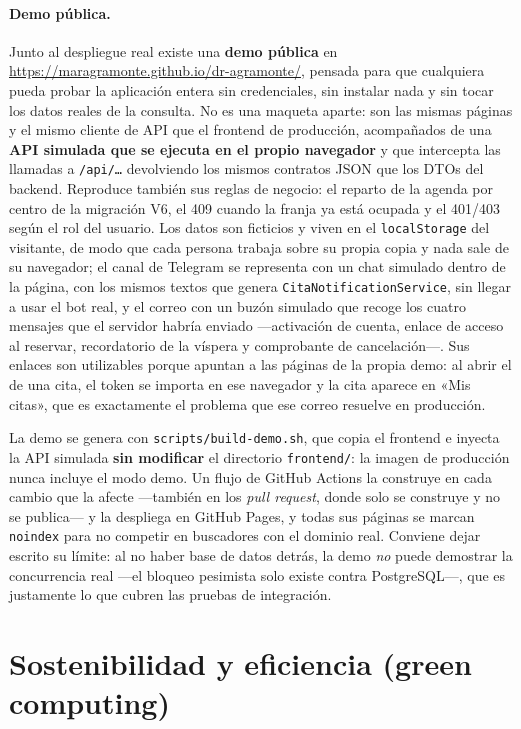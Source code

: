 \documentclass[12pt,a4paper]{report}
\begin{document}
\paragraph{Demo pública.} Junto al despliegue real existe una \textbf{demo pública} en \url{https://maragramonte.github.io/dr-agramonte/}, pensada para que cualquiera pueda probar la aplicación entera sin credenciales, sin instalar nada y sin tocar los datos reales de la consulta. No es una maqueta aparte: son las mismas páginas y el mismo cliente de API que el frontend de producción, acompañados de una \textbf{API simulada que se ejecuta en el propio navegador} y que intercepta las llamadas a \texttt{/api/\ldots} devolviendo los mismos contratos JSON que los DTOs del backend. Reproduce también sus reglas de negocio: el reparto de la agenda por centro de la migración V6, el 409 cuando la franja ya está ocupada y el 401/403 según el rol del usuario. Los datos son ficticios y viven en el \texttt{localStorage} del visitante, de modo que cada persona trabaja sobre su propia copia y nada sale de su navegador; el canal de Telegram se representa con un chat simulado dentro de la página, con los mismos textos que genera \texttt{CitaNotificationService}, sin llegar a usar el bot real, y el correo con un buzón simulado que recoge los cuatro mensajes que el servidor habría enviado —activación de cuenta, enlace de acceso al reservar, recordatorio de la víspera y comprobante de cancelación—. Sus enlaces son utilizables porque apuntan a las páginas de la propia demo: al abrir el de una cita, el token se importa en ese navegador y la cita aparece en «Mis citas», que es exactamente el problema que ese correo resuelve en producción.

La demo se genera con \texttt{scripts/build-demo.sh}, que copia el frontend e inyecta la API simulada \textbf{sin modificar} el directorio \texttt{frontend/}: la imagen de producción nunca incluye el modo demo. Un flujo de GitHub Actions la construye en cada cambio que la afecte —también en los \emph{pull request}, donde solo se construye y no se publica— y la despliega en GitHub Pages, y todas sus páginas se marcan \texttt{noindex} para no competir en buscadores con el dominio real. Conviene dejar escrito su límite: al no haber base de datos detrás, la demo \emph{no} puede demostrar la concurrencia real —el bloqueo pesimista solo existe contra PostgreSQL—, que es justamente lo que cubren las pruebas de integración.

\section{Sostenibilidad y eficiencia (green computing)}
\end{document}
